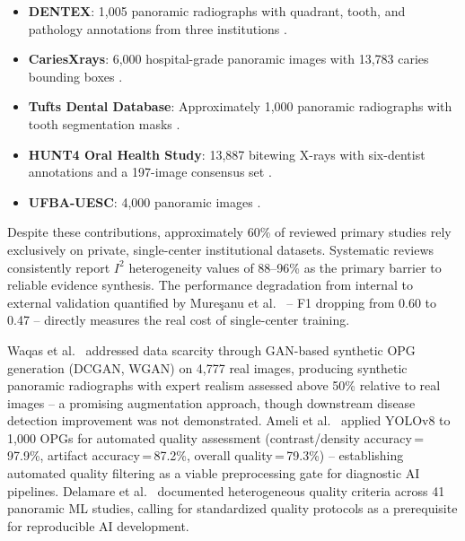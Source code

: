 \documentclass[conference]{IEEEtran}
\begin{document}
\begin{itemize}
  \item \textbf{DENTEX}: 1,005 panoramic radiographs with quadrant,
        tooth, and pathology annotations from three institutions
        \cite{nassiri2025yolo,vannistelrooij2024combining,bizjak2024advancing}.
  \item \textbf{CariesXrays}: 6,000 hospital-grade panoramic images
        with 13,783 caries bounding boxes \cite{chen2024cariesxrays}.
  \item \textbf{Tufts Dental Database}: Approximately 1,000 panoramic
        radiographs with tooth segmentation masks
        \cite{cerda2024determining,kim2024unsupervised,zhang2025reliable,yaswanth2025automated}.
  \item \textbf{HUNT4 Oral Health Study}: 13,887 bitewing X-rays with
        six-dentist annotations and a 197-image consensus set
        \cite{perez2024ai}.
  \item \textbf{UFBA-UESC}: 4,000 panoramic images
        \cite{asadi2024detection}.
\end{itemize}

Despite these contributions, approximately 60\% of reviewed primary
studies rely exclusively on private, single-center institutional
datasets. Systematic reviews
\cite{iacob2025automated,albano2024artificial,luke2025accuracy,bonfanti2025deep,khubrani2025detection}
consistently report $I^2$ heterogeneity values of 88--96\% as the
primary barrier to reliable evidence synthesis. The performance
degradation from internal to external validation quantified by
Mure\c{s}anu et al.~\cite{muresanu2024automating} -- F1 dropping from
0.60 to 0.47 -- directly measures the real cost of single-center
training.

Waqas et al.~\cite{waqas2025synthetic} addressed data scarcity through
GAN-based synthetic OPG generation (DCGAN, WGAN) on 4,777 real images,
producing synthetic panoramic radiographs with expert realism assessed
above 50\% relative to real images -- a promising augmentation approach,
though downstream disease detection improvement was not demonstrated.
Ameli et al.~\cite{ameli2025automated} applied YOLOv8 to 1,000 OPGs for
automated quality assessment (contrast/density accuracy\,=\,97.9\%,
artifact accuracy\,=\,87.2\%, overall quality\,=\,79.3\%) --
establishing automated quality filtering as a viable preprocessing gate
for diagnostic AI pipelines. Delamare et al.~\cite{delamare2024panoramic}
documented heterogeneous quality criteria across 41 panoramic ML
studies, calling for standardized quality protocols as a prerequisite for
reproducible AI development.
\end{document}
